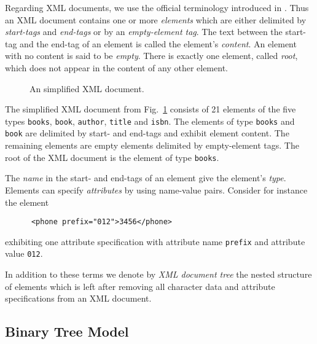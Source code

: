 \documentclass[12pt]{llncs}
\begin{document}
Regarding XML documents, we use the official terminology introduced in
\cite{Yergeau08}. Thus an XML document contains one or more
\emph{elements} which are either delimited by \emph{start-tags} and
\emph{end-tags} or by an \emph{empty-element tag}. The text between
the start-tag and the end-tag of an element is called the element's
\emph{content}. An element with no content is said to be 
\emph{empty}. There is exactly one element, called \emph{root}, which does not appear in the content of any other element.
\begin{figure}[t]\small
	
	\caption{An simplified XML document.\label{fig:XmlDocument}}
\end{figure}
\begin{example}\label{ex:XmlDocument}
The simplified XML document from Fig.~\ref{fig:XmlDocument} consists
of 21 elements of the five types \texttt{books}, \texttt{book},
\texttt{author}, \texttt{title} and \texttt{isbn}. The elements of
type \texttt{books} and \texttt{book} are delimited by start- and
end-tags and exhibit element content. The remaining elements are empty
elements delimited by 
empty-element tags. The root of the XML document is the element of type \texttt{books}.
\end{example}
The \emph{name} in the start- and end-tags of an 
element give the element's \emph{type}. Elements can 
specify \emph{attributes} by using name-value pairs. Consider for instance the element
\begin{verbatim}
      <phone prefix="012">3456</phone>
\end{verbatim}
exhibiting one attribute specification with attribute name \texttt{prefix} and attribute value \texttt{012}.

In addition to these terms we denote by \emph{XML document tree} 
the nested structure of elements which is left after 
removing all character data and attribute specifications from an XML document.

\subsection{Binary Tree Model}\label{sec:binaryTreeModel}
\end{document}
